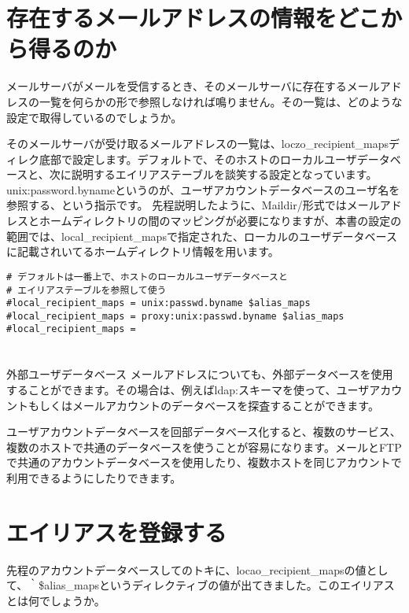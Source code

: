 \section{存在するメールアドレスの情報をどこから得るのか}
メールサーバがメールを受信するとき、そのメールサーバに存在するメールアドレスの一覧を何らかの形で参照しなければ鳴りません。その一覧は、どのような設定で取得しているのでしょうか。

そのメールサーバが受け取るメールアドレスの一覧は、loczo\_recipient\_mapsディレク底部で設定します。デフォルトで、そのホストのローカルユーザデータベースと、次に説明するエイリアステーブルを談笑する設定となっています。unix:password.bynameというのが、ユーザアカウントデータベースのユーザ名を参照する、という指示です。
先程説明したように、Maildir/形式ではメールアドレスとホームディレクトリの間のマッピングが必要になりますが、本書の設定の範囲では、local\_recipient\_mapsで指定された、ローカルのユーザデータベースに記載されいてるホームディレクトリ情報を用います。

\begin{lstlisting}[basicstyle=\ttfamily\footnotesize, frame=single]
# デフォルトは一番上で、ホストのローカルユーザデータベースと
# エイリアステーブルを参照して使う
#local_recipient_maps = unix:passwd.byname $alias_maps
#local_recipient_maps = proxy:unix:passwd.byname $alias_maps
#local_recipient_maps =
\end{lstlisting}

\section*{}
\begin{itembox}[l]{外部ユーザデータベース}
メールアドレスについても、外部データベースを使用することができます。その場合は、例えばldap:スキーマを使って、ユーザアカウントもしくはメールアカウントのデータベースを探査することができます。

ユーザアカウントデータベースを回部データベース化すると、複数のサービス、複数のホストで共通のデータベースを使うことが容易になります。メールとFTPで共通のアカウントデータベースを使用したり、複数ホストを同じアカウントで利用できるようにしたりできます。
\end{itembox}


\section{エイリアスを登録する}
先程のアカウントデータベースしてのトキに、locao\_recipient\_mapsの値として、｀\$alias\_mapsというディレクティブの値が出てきました。このエイリアスとは何でしょうか。

